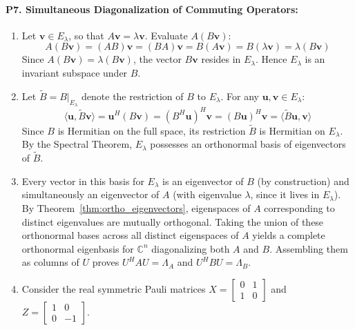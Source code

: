 \paragraph{P7. Simultaneous Diagonalization of Commuting Operators:}
\begin{enumerate}[label=(\alph*)]
    \item Let $\mathbf{v} \in E_\lambda$, so that $A\mathbf{v} = \lambda \mathbf{v}$.
    Evaluate $A(B\mathbf{v})$:
    \begin{equation*}
    A(B\mathbf{v}) = (AB)\mathbf{v} = (BA)\mathbf{v} = B(A\mathbf{v}) = B(\lambda \mathbf{v}) = \lambda (B\mathbf{v})
    \end{equation*}
    Since $A(B\mathbf{v}) = \lambda (B\mathbf{v})$, the vector $B\mathbf{v}$ resides in $E_\lambda$. Hence $E_\lambda$ is an invariant subspace under $B$.
    \item Let $\tilde{B} = B|_{E_\lambda}$ denote the restriction of $B$ to $E_\lambda$.
    For any $\mathbf{u}, \mathbf{v} \in E_\lambda$:
    \begin{equation*}
    \langle \mathbf{u}, \tilde{B}\mathbf{v} \rangle = \mathbf{u}^H (B\mathbf{v}) = (B^H \mathbf{u})^H \mathbf{v} = (B\mathbf{u})^H \mathbf{v} = \langle \tilde{B}\mathbf{u}, \mathbf{v} \rangle
    \end{equation*}
    Since $B$ is Hermitian on the full space, its restriction $\tilde{B}$ is Hermitian on $E_\lambda$. By the Spectral Theorem, $E_\lambda$ possesses an orthonormal basis of eigenvectors of $\tilde{B}$.
    \item Every vector in this basis for $E_\lambda$ is an eigenvector of $B$ (by construction) and simultaneously an eigenvector of $A$ (with eigenvalue $\lambda$, since it lives in $E_\lambda$).
    By Theorem~\ref{thm:ortho_eigenvectors}, eigenspaces of $A$ corresponding to distinct eigenvalues are mutually orthogonal.
    Taking the union of these orthonormal bases across all distinct eigenspaces of $A$ yields a complete orthonormal eigenbasis for $\mathbb{C}^n$ diagonalizing both $A$ and $B$. Assembling them as columns of $U$ proves $U^H A U = \Lambda_A$ and $U^H B U = \Lambda_B$.
    \item Consider the real symmetric Pauli matrices $X = \begin{bmatrix} 0 & 1 \\ 1 & 0 \end{bmatrix}$ and $Z = \begin{bmatrix} 1 & 0 \\ 0 & -1 \end{bmatrix}$.

\end{enumerate}
